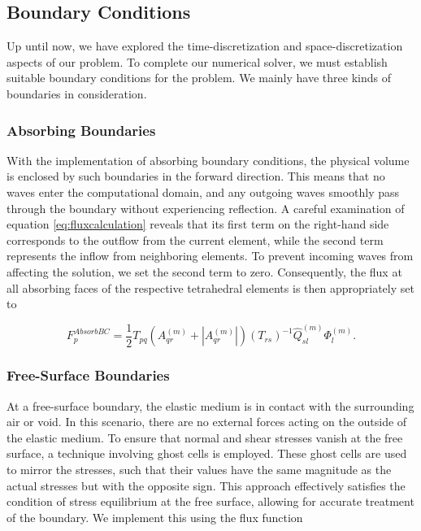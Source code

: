 \subsection{Boundary Conditions}
Up until now, we have explored the time-discretization and space-discretization aspects of our problem. To complete our numerical
solver, we must establish suitable boundary conditions for the problem. We mainly have three kinds of boundaries in consideration.

\subsubsection{Absorbing Boundaries}
With the implementation of absorbing boundary conditions, the physical volume is enclosed by such boundaries in the forward direction. This means that no waves enter the computational domain, and any outgoing waves smoothly pass through the boundary without experiencing
reflection. A careful examination of equation \ref{eq:fluxcalculation} reveals that its first term on the right-hand side corresponds
to the outflow from the current element, while the second term represents the inflow from neighboring elements. To prevent incoming
waves from affecting the solution, we set the second term to zero. Consequently, the flux at all absorbing faces of the respective
tetrahedral elements is then appropriately set to

\begin{equation}
    F_p^{AbsorbBC} = \frac{1}{2} T_{pq} \left(A_{qr}^{\left(m\right)} + \left|A_{qr}^{\left(m\right)}\right|\right) \left(T_{rs}\right)^{-1} \hat{Q}_{sl}^{\left(m\right)} \Phi_l^{\left(m\right)}.
\end{equation}

\subsubsection{Free-Surface Boundaries}
At a free-surface boundary, the elastic medium is in contact with the surrounding air or void. In this scenario, there are no external forces
acting on the outside of the elastic medium. To ensure that normal and shear stresses vanish at the free surface, a technique involving
ghost cells is employed. These ghost cells are used to mirror the stresses, such that their values have the same magnitude as the actual
stresses but with the opposite sign. This approach effectively satisfies the condition of stress equilibrium at the free surface, allowing
for accurate treatment of the boundary. We implement this using the flux function ~\parencite{dumbser1}

